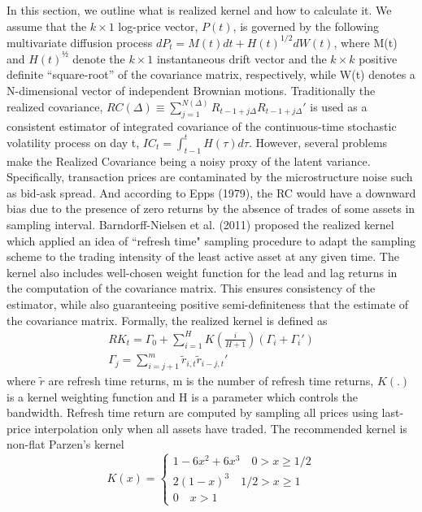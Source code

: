 \documentclass[titlepage,11pt]{article}
\begin{document}
In this section, we outline what is realized kernel and how to calculate it.
We assume that the $k \times 1$ log-price vector, $P(t)$, is governed by the following multivariate diffusion process $d P_t = M(t) dt + H(t)^{1/2}dW(t)$, where M(t) and $H(t)^{½}$ denote the $k \times 1$ instantaneous drift vector and the $k \times k$ positive definite “square-root” of the covariance matrix, respectively, while W(t) denotes a N-dimensional vector of independent Brownian motions. 
Traditionally the  realized covariance, $RC(\Delta) \equiv \sum_{j=1}^{N(\Delta)} R_{t-1+j\Delta}R_{t-1+j\Delta}'$ is used as a consistent estimator of integrated  covariance of the continuous-time stochastic volatility process on day t, $IC_t = \int_{t-1}^tH(\tau)d\tau$. However, several problems make the Realized Covariance being a noisy proxy of the latent variance. Specifically,  transaction prices are contaminated by the microstructure noise such as bid-ask spread. And according to Epps (1979), the RC would have a downward bias due to the presence of zero returns by the absence of trades of some assets in sampling interval. 
Barndorff-Nielsen et al. (2011) proposed the realized kernel which applied an idea of “refresh time" sampling procedure to adapt the sampling scheme to the  trading intensity of the least active asset at any given time. The kernel also includes well-chosen weight function for the lead and lag returns in the computation of the covariance matrix. This ensures consistency of the estimator, while also guaranteeing positive semi-definiteness that the estimate of the covariance matrix.
Formally, the realized kernel is defined as 
\begin{align}
RK_t = \Gamma_0+\sum_{i=1}^H K\left(\frac{i}{H+1}\right)(\Gamma_i+\Gamma_i')\\
\Gamma_j = \sum_{i=j+1}^m \tilde{r}_{i,t}\tilde{r}_{i-j,t}'
\end{align}
where $\tilde{r}$ are refresh time returns, m is the number of refresh time returns, $K (.) $is a kernel weighting function and H is a parameter which controls the bandwidth.
Refresh time return are computed by sampling all prices using last-price interpolation only when all assets have traded. The recommended kernel is non-flat Parzen’s kernel
\begin{equation*}
K(x) = \begin{cases}
1-6x^2+6x^3 \quad 0>x \geq 1/2  \\
2(1-x)^3 \quad 1/2>x \geq 1\\
0  \quad x >1
\end{cases}
\end{equation*}
\end{document}
